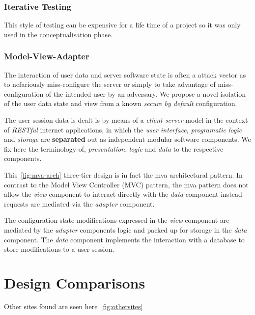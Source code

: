 \documentclass[letterpaper,12pt]{article}
\begin{document}
\subsubsection{Iterative Testing}

This style of testing can be expensive for a life time of a project so it was only used in the conceptualisation phase.

\subsubsection{Model-View-Adapter}

The interaction of user data and server software state is often a attack vector
as to nefariously miss-configure the server or simply to take advantage of
miss-configuration of the intended user by an adversary. We propose a novel
isolation of the user data state and view from a known \emph{secure by default}
configuration.

The user session data is dealt is by means of a \emph{client-server}
model in the context of \emph{RESTful} internet applications, in which
the \emph{user interface}, \emph{programatic logic}
and \emph{storage} are \textbf{separated} out as
independent modular software components. We fix here the terminology of,
\emph{presentation}, \emph{logic} and \emph{data} to the respective
components.



This~\ref{fig:mva-arch} three-tier design is in fact the \acrfull{mva} architectural pattern. In contrast to the Model View Controller (MVC)
pattern, the \acrshort{mva} pattern does not allow the \emph{view} component to interact
directly with the \emph{data} component instead requests are mediated via the
\emph{adapter} component.

The configuration state modifications expressed in the \emph{view} component
are mediated by the \emph{adapter} components logic and packed up for storage
in the \emph{data} component. The \emph{data} component implements the
interaction with a database to store modifications to a user session.

\section{Design Comparisons}

Other sites found are seen here~\ref{fig:othersites}
\end{document}
